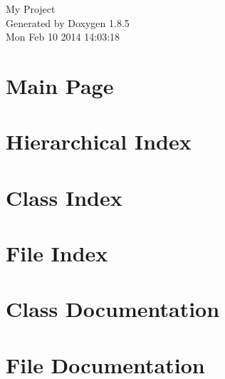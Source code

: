 \documentclass[twoside]{book}
\newcommand{\clearemptydoublepage}{%
  \newpage{\pagestyle{empty}\cleardoublepage}%
}
\begin{document}
\hypersetup{pageanchor=false}
\begin{titlepage}
\vspace*{7cm}
\begin{center}%
{\Large My Project }\\
\vspace*{1cm}
{\large Generated by Doxygen 1.8.5}\\
\vspace*{0.5cm}
{\small Mon Feb 10 2014 14:03:18}\\
\end{center}
\end{titlepage}
\clearemptydoublepage
\tableofcontents
\clearemptydoublepage
{}
\hypersetup{pageanchor=true}

\chapter{Main Page}
\label{index}\hypertarget{index}{}
\chapter{Hierarchical Index}

\chapter{Class Index}

\chapter{File Index}

\chapter{Class Documentation}




















\chapter{File Documentation}


\newpage
{}
{}
\printindex
\end{document}
